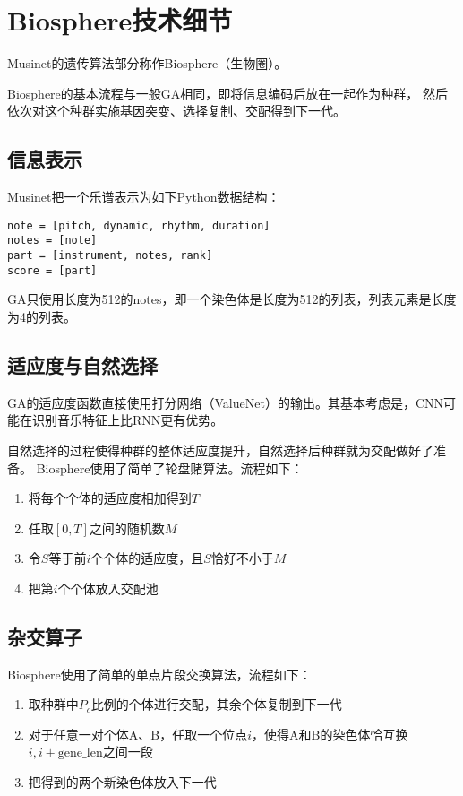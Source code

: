 \documentclass{ctexart}
\begin{document}
\section{Biosphere技术细节}
Musinet的遗传算法部分称作Biosphere（生物圈）。

Biosphere的基本流程与一般GA相同，即将信息编码后放在一起作为种群，
然后依次对这个种群实施基因突变、选择复制、交配得到下一代。

\subsection{信息表示}
Musinet把一个乐谱表示为如下Python数据结构：
\begin{lstlisting}
note = [pitch, dynamic, rhythm, duration]
notes = [note]
part = [instrument, notes, rank]
score = [part]
\end{lstlisting}
GA只使用长度为512的notes，即一个染色体是长度为512的列表，列表元素是长度为4的列表。

\subsection{适应度与自然选择}
GA的适应度函数直接使用打分网络（ValueNet）的输出。其基本考虑是，CNN可能在识别音乐特征上比RNN更有优势。

自然选择的过程使得种群的整体适应度提升，自然选择后种群就为交配做好了准备。
Biosphere使用了简单了轮盘赌算法。流程如下：
\begin{enumerate}[nosep]
  \item 将每个个体的适应度相加得到$T$
  \item 任取$[0,T]$之间的随机数$M$
  \item 令$S$等于前$i$个个体的适应度，且$S$恰好不小于$M$
  \item 把第$i$个个体放入交配池
\end{enumerate}

\subsection{杂交算子}
Biosphere使用了简单的单点片段交换算法，流程如下：
\begin{enumerate}[nosep]
  \item 取种群中$P_c$比例的个体进行交配，其余个体复制到下一代
  \item 对于任意一对个体A、B，任取一个位点$i$，使得A和B的染色体恰互换$i,i+\mathrm{gene\_len}$之间一段
  \item 把得到的两个新染色体放入下一代
\end{enumerate}
\end{document}
